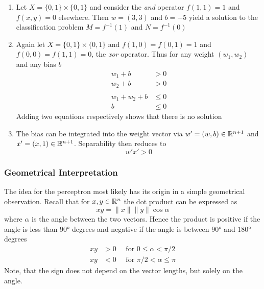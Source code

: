 \begin{examples}
    \hfill
    \begin{enumerate}
        \item Let \( X = \{ 0, 1 \} \times \{ 0, 1 \} \) and consider the \emph{and} operator
              \( f(1, 1) = 1 \) and \( f(x, y) = 0 \) elsewhere. Then \( w = (3, 3) \) and \( b = -5 \)
              yield a solution to the classification problem \( M = f^{-1}(1) \) and \( N = f^{-1}(0) \)
        \item Again let \( X = \{ 0, 1 \} \times \{ 0, 1 \} \) and \( f(1, 0) = f(0, 1) = 1 \) and
              \( f(0, 0) = f(1, 1) = 0 \), the \emph{xor} operator. Thus for any weight \( (w_1, w_2) \) and
              any bias \( b \)
              \[
                  \begin{split}
                      w_1 + b & > 0 \\
                      w_2 + b & > 0 \\
                      \\
                      w_1 + w_2 + b & \le 0 \\
                      b & \le 0
                  \end{split}
              \]
              Adding two equations respectively shows that there is no solution
        \item The bias can be integrated into the weight vector via \( w' = (w, b) \in \mathbb{R}^{n + 1} \) and
              \( x' = (x, 1) \in \mathbb{R}^{n + 1} \). Separability then reduces to
              \[
                  w'x' > 0
              \]
    \end{enumerate}
\end{examples}
\bigskip


\subsubsection*{Geometrical Interpretation}
The idea for the perceptron most likely has its origin in a simple geometrical observation.
Recall that for \( x, y \in \mathbb{R}^n \) the dot product can be expressed as
\[
    xy = \|x\| \|y\| \cos\alpha
\]
where \( \alpha \) is the angle between the two vectors. Hence the product is positive
if the angle is less than \( \ang{90} \) degrees and negative if the angle is between \( \ang{90} \)
and \( \ang{180} \) degrees
\[
    \begin{split}
        xy & > 0 \hspace{1em}\text{ for } 0 \le \alpha < \pi / 2 \\
        xy & < 0 \hspace{1em}\text{ for } \pi / 2 < \alpha \le \pi
    \end{split}
\]
Note, that the sign does not depend on the vector lengths, but solely on the angle.

